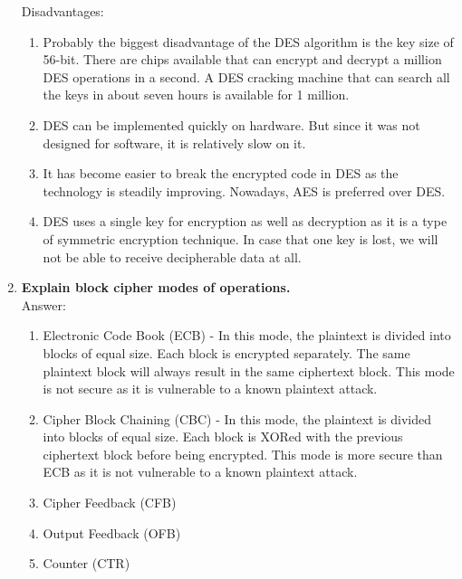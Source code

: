 \documentclass[11pt]{article}
\begin{document}
\begin{enumerate}
	      Disadvantages:
	      \begin{enumerate}
		      \item Probably the biggest disadvantage of the DES algorithm is the key size of 56-bit. There are chips available that can encrypt and decrypt a million DES operations in a second. A DES cracking machine that can search all the keys in about seven hours is available for 1 million.
		      \item DES can be implemented quickly on hardware. But since it was not designed for software, it is relatively slow on it.
		      \item It has become easier to break the encrypted code in DES as the technology is steadily improving. Nowadays, AES is preferred over DES.
		      \item DES uses a single key for encryption as well as decryption as it is a type of symmetric encryption technique. In case that one key is lost, we will not be able to receive decipherable data at all.
	      \end{enumerate}

	\item \textbf{Explain block cipher modes of operations.}\\
	      Answer:
	      \begin{enumerate}
		      \item Electronic Code Book (ECB) - In this mode, the plaintext is divided into blocks of equal size. Each block is encrypted separately. The same plaintext block will always result in the same ciphertext block. This mode is not secure as it is vulnerable to a known plaintext attack.
		      \item Cipher Block Chaining (CBC) - In this mode, the plaintext is divided into blocks of equal size. Each block is XORed with the previous ciphertext block before being encrypted. This mode is more secure than ECB as it is not vulnerable to a known plaintext attack.
		      \item Cipher Feedback (CFB)
		      \item Output Feedback (OFB)
		      \item Counter (CTR) 
	      \end{enumerate}
\end{enumerate}
\end{document}
